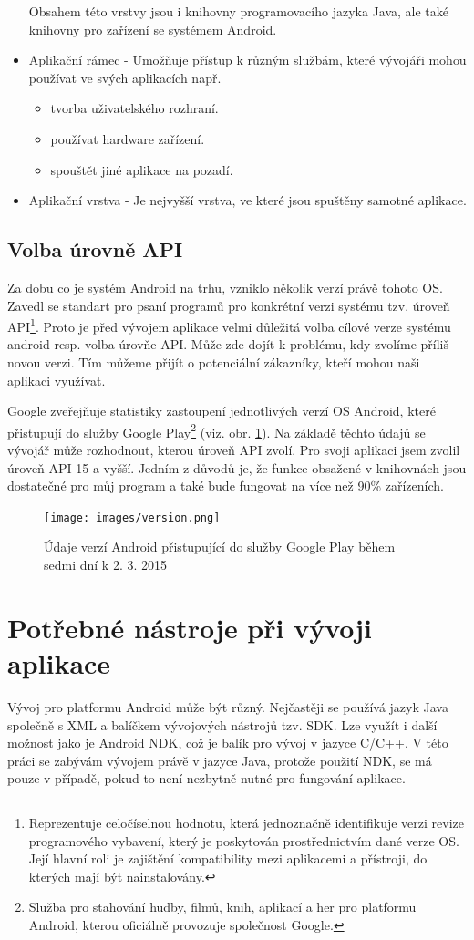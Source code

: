 \documentclass[12pt]{article}
\begin{document}
\begin{itemize}
Obsahem této vrstvy jsou i knihovny programovacího jazyka Java, ale také knihovny pro zařízení se systémem Android.
\item Aplikační rámec - Umožňuje přístup k různým službám, které vývojáři mohou používat ve svých aplikacích např.
\begin{itemize}
\item tvorba uživatelského rozhraní.
\item používat hardware zařízení.
\item spouštět jiné aplikace na pozadí.
\end{itemize}
\item Aplikační vrstva - Je nejvyšší vrstva, ve které jsou spuštěny samotné aplikace.
\end{itemize}
\subsection{Volba úrovně API}
Za dobu co je systém Android na trhu, vzniklo několik verzí právě tohoto OS. Zavedl se standart pro psaní programů pro konkrétní verzi systému tzv. úroveň API\footnote[2]{Reprezentuje celočíselnou hodnotu, která jednoznačně identifikuje verzi revize programového vybavení, který je poskytován prostřednictvím dané verze OS. Její hlavní roli je zajištění kompatibility mezi aplikacemi a přístroji, do kterých mají být nainstalovány.}. Proto je před vývojem aplikace velmi důležitá volba cílové verze systému android resp. volba úrovňe API. Může zde dojít k problému, kdy zvolíme příliš novou verzi. Tím můžeme přijít o potenciální zákazníky, kteří mohou naši aplikaci využívat.

Google zveřejňuje statistiky zastoupení jednotlivých verzí OS Android, které přistupují do služby Google Play\footnote[3]{Služba pro stahování hudby, filmů, knih, aplikací a her pro platformu Android, kterou oficiálně provozuje společnost Google.} (viz. obr. \ref{api}).
Na základě těchto údajů se vývojář může rozhodnout, kterou úroveň API zvolí. Pro svoji aplikaci jsem zvolil úroveň API 15 a vyšší. Jedním z důvodů je, že funkce obsažené v knihovnách jsou dostatečné pro můj program a také bude fungovat na více než 90\% zařízeních.
\begin{figure}[ht]
\centerline{\texttt{[image: images/version.png]}}
\caption{Údaje verzí Android přistupující do služby Google Play během sedmi dní k 2. 3. 2015\cite{volba}} \label{api}
\end{figure}


\newpage
\section{Potřebné nástroje při vývoji aplikace}
Vývoj pro platformu Android může být různý. Nejčastěji se používá jazyk Java společně s XML a balíčkem vývojových nástrojů tzv. SDK. Lze využít i další možnost jako je Android NDK, což je balík pro vývoj v jazyce C/C++. V této práci se zabývám vývojem právě v jazyce Java, protože použití NDK, se má pouze v případě, pokud to není nezbytně nutné pro fungování aplikace.
\end{document}
